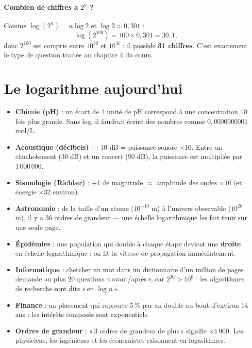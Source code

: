\documentclass[11pt,a4paper]{article}
\begin{document}
\paragraph{Combien de chiffres a $2^{n}$ ?}
Comme $\log(2^{n}) = n \log 2$ et $\log 2 \approx 0{,}301$ :
\[ \log(2^{100}) = 100 \times 0{,}301 = 30{,}1, \]
donc $2^{100}$ est compris entre $10^{30}$ et $10^{31}$ : il possède \textbf{31 chiffres}. C'est exactement le type de question traitée au chapitre 4 du cours.

\section{Le logarithme aujourd'hui}
\begin{itemize}[leftmargin=1.5em,itemsep=2pt]
\item \textbf{Chimie (pH)} : un écart de 1 unité de pH correspond à une concentration 10 fois plus grande. Sans log, il faudrait écrire des nombres comme $0{,}0000000001$ mol/L.
\item \textbf{Acoustique (décibels)} : +10 dB = puissance sonore $\times 10$. Entre un chuchotement (30 dB) et un concert (90 dB), la puissance est multipliée par 1\,000\,000.
\item \textbf{Sismologie (Richter)} : +1 de magnitude $\approx$ amplitude des ondes $\times 10$ (et énergie $\times 32$ environ).
\item \textbf{Astronomie} : de la taille d'un atome ($10^{-10}$ m) à l'univers observable ($10^{26}$ m), il y a 36 ordres de grandeur --- une échelle logarithmique les fait tenir sur une seule page.
\item \textbf{Épidémies} : une population qui double à chaque étape devient une \textbf{droite} en échelle logarithmique : on lit la vitesse de propagation immédiatement.
\item \textbf{Informatique} : chercher un mot dans un dictionnaire d'un million de pages demande au plus 20 questions «\,avant/après\,», car $2^{20} > 10^{6}$ : les algorithmes de recherche sont dits «\,en $\log n$\,».
\item \textbf{Finance} : un placement qui rapporte 5\,\% par an double au bout d'environ 14 ans : les intérêts composés sont exponentiels.
\item \textbf{Ordres de grandeur} : «\,3 ordres de grandeur de plus\,» signifie $\times 1\,000$. Les physiciens, les ingénieurs et les économistes raisonnent en logarithmes.
\end{itemize}
\end{document}
